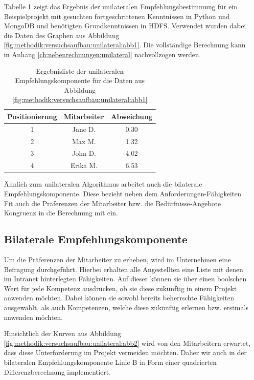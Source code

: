 Tabelle \ref{tbl:methodik:versuchsaufbau:unilateral:tbl2} zeigt das Ergebnis der unilateralen Empfehlungsbestimmung für ein Beispielprojekt mit gesuchten fortgeschrittenen Kenntnissen in Python und MongoDB und benötigten Grundkenntnissen in HDFS. Verwendet wurden dabei die Daten des Graphen aus Abbildung \ref{fig:methodik:versuchsaufbau:unilateral:abb1}. Die vollständige Berechnung kann in Anhang \ref{ch:nebenrechnungen:unilateral} nachvollzogen werden.

\begin{table}[h]
	\centering
	\begin{tabular}{c|c|c}
		Positionierung & Mitarbeiter & Abweichung\\
		\hline
		1 & Jane D.  & 0.30\\
		2 & Max M.   & 1.32\\
		3 & John D.  & 4.02\\
		4 & Erika M. & 6.53
	\end{tabular}
	\caption{Ergebnisliste der unilateralen Empfehlungskomponente für die Daten aus Abbildung \ref{fig:methodik:versuchsaufbau:unilateral:abb1}}
	\label{tbl:methodik:versuchsaufbau:unilateral:tbl2}
\end{table}

Ähnlich zum unilateralen Algorithmus arbeitet auch die bilaterale Empfehlungskomponente. Diese bezieht neben dem Anforderungen-Fähigkeiten Fit auch die Präferenzen der Mitarbeiter bzw. die Bedürfnisse-Angebote Kongruenz in die Berechnung mit ein.

\subsection{Bilaterale Empfehlungskomponente}
\label{ch:methodik:versuchsaufbau:bilateral}
Um die Präferenzen der Mitarbeiter zu erheben, wird im Unternehmen eine Befragung durchgeführt. Hierbei erhalten alle Angestellten eine Liste mit denen im Intranet hinterlegten Fähigkeiten. Auf dieser können sie über einen boolschen Wert für jede Kompetenz ausdrücken, ob sie diese zukünftig in einem Projekt anwenden möchten. Dabei können sie sowohl bereits beherrschte Fähigkeiten ausgewählt, als auch Kompetenzen, welche diese zukünftig erlernen bzw. erstmals anwenden möchten.

Hinsichtlich der Kurven aus Abbildung \ref{fig:methodik:versuchsaufbau:unilateral:abb2} wird von den Mitarbeitern erwartet, dass diese Unterforderung im Projekt vermeiden möchten. Daher wir auch in der bilateralen Empfehlungskomponente Linie B in Form einer quadrierten Differenzberechnung implementiert.

